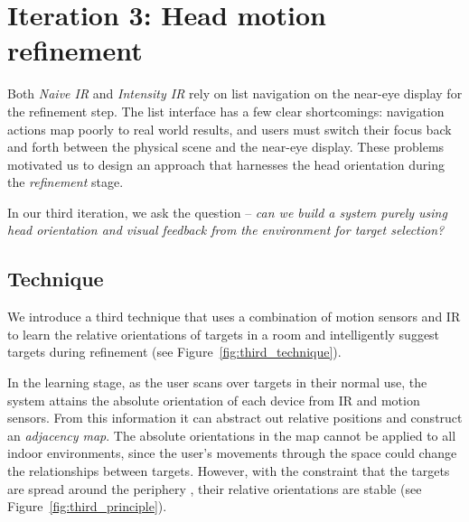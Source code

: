 \newpage
\section{Iteration 3: Head motion refinement}
\label{sec:iteration-3:-head}

Both {\em Naive IR} and {\em Intensity IR} rely on list navigation on the
near-eye display for the refinement step. The list interface has a few clear
shortcomings: navigation actions map poorly to real world results, and
users must switch their focus back and forth between the physical scene and the
near-eye display. These problems motivated us to design an approach that
harnesses the head orientation during the {\em refinement} stage.

In our third iteration, we ask the  question --
{\em can we build a system purely using head orientation and visual
  feedback from the environment for target selection?}

\subsection{Technique}

We introduce a third technique that uses a combination of motion sensors and IR
to learn the relative orientations of targets in a room and intelligently
suggest targets during refinement (see Figure~\ref{fig:third_technique}).

In the learning stage, as the user scans over targets in their normal
use, the system attains the absolute orientation of each device from
IR and motion sensors. From this information it can abstract out
 relative positions  and construct an
{\em adjacency map}. The absolute orientations in the map cannot be
applied to all indoor environments, since the user's movements through
the space could change the relationships between targets. However,
with the constraint that the targets are spread around the periphery
, their relative orientations are stable
(see Figure~\ref{fig:third_principle}). 

